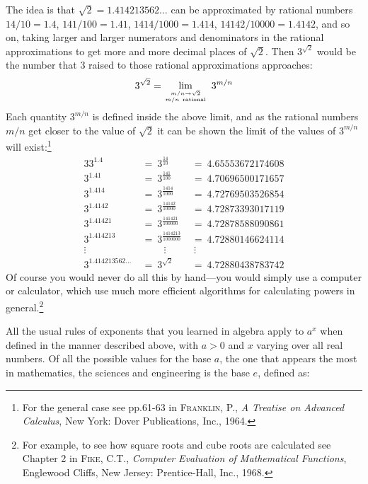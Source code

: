 The idea is that $\sqrt{2} = 1.414213562\ldots$ can be approximated
by rational numbers $14/10 = 1.4$, $141/100 = 1.41$, $1414/1000 = 1.414$,
$14142/10000 = 1.4142$, and so on, taking larger and larger numerators and
denominators in the rational approximations to get more and more decimal places
of $\sqrt{2}$. Then $3^{\sqrt{2}}$ would be the number that 3 raised to those
rational approximations approaches:
\[
3^{\sqrt{2}} = \lim_{\genfrac{}{}{0pt}{}{m/n \to \sqrt{2}}{m/n~\text{rational}}}\;3^{m/n}
\]
Each quantity $3^{m/n}$ is defined inside the above limit, and as the rational
numbers $m/n$ get closer to the value of $\sqrt{2}$ it can be shown the limit
of the values of $3^{m/n}$ will exist:\footnote{For the general case see pp.61-63 in
\textsc{Franklin, P.}, \emph{A Treatise on Advanced Calculus}, New York: Dover
Publications, Inc., 1964.}
\begin{alignat*}{3}
3^{1.4} ~&=~ 3^{\frac{14}{10}} ~&=~ 4.65553672174608\\
3^{1.41} ~&=~ 3^{\frac{141}{100}} ~&=~ 4.70696500171657\\
3^{1.414} ~&=~ 3^{\frac{1414}{1000}} ~&=~ 4.72769503526854\\
3^{1.4142} ~&=~ 3^{\frac{14142}{10000}} ~&=~ 4.72873393017119\\
3^{1.41421} ~&=~ 3^{\frac{141421}{100000}} ~&=~ 4.72878588090861\\
3^{1.414213} ~&=~ 3^{\frac{1414213}{1000000}} ~&=~ 4.72880146624114\\
\vdots \qquad ~&~ \qquad \vdots ~&~ \vdots \qquad \qquad\\
3^{1.414213562\ldots} ~&=~ 3^{\sqrt{2}} ~&=~ 4.72880438783742
\end{alignat*}
Of course you would never do all this by hand---you would simply use a computer
or calculator, which use much more efficient algorithms for calculating powers
in general.\footnote{For example, to see how square roots and cube roots are
calculated see Chapter 2 in \textsc{Fike, C.T.}, \emph{Computer Evaluation of
Mathematical Functions}, Englewood Cliffs, New Jersey: Prentice-Hall, Inc., 1968.}

All the usual rules of exponents that you learned in algebra apply to $a^x$ when
defined in the manner described above, with $a > 0$ and $x$ varying over
all real numbers. Of all the possible values for the base $a$, the one that
appears the most in mathematics, the sciences and engineering is the base
$e$, defined as:


